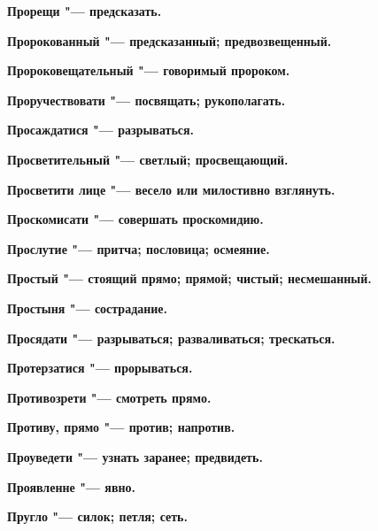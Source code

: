 \begin{mymulticols}{2}
\bfseries Прорещи\normalfont{} "--- предсказать. 




\bfseries Пророкованный\normalfont{} "--- предсказанный; предвозвещенный. 




\bfseries Пророковещательный\normalfont{} "--- говоримый пророком. 




\bfseries Проручествовати\normalfont{} "--- посвящать; рукополагать. 




\bfseries Просаждатися\normalfont{} "--- разрываться. 




\bfseries Просветительный\normalfont{} "--- светлый; просвещающий. 




\bfseries Просветити лице\normalfont{} "--- весело или милостивно взглянуть. 




\bfseries Проскомисати\normalfont{} "--- совершать проскомидию. 




\bfseries Прослутие\normalfont{} "--- притча; пословица; осмеяние. 




\bfseries Простый\normalfont{} "--- стоящий прямо; прямой; чистый; несмешанный. 




\bfseries Простыня\normalfont{} "--- сострадание. 




\bfseries Просядати\normalfont{} "--- разрываться; разваливаться; трескаться. 




\bfseries Протерзатися\normalfont{} "--- прорываться. 




\bfseries Противозрети\normalfont{} "--- смотреть прямо. 




\bfseries Противу, прямо\normalfont{} "--- против; напротив. 




\bfseries Проуведети\normalfont{} "--- узнать заранее; предвидеть. 




\bfseries Проявленне\normalfont{} "--- явно. 




\bfseries Пругло\normalfont{} "--- силок; петля; сеть. 





\end{mymulticols}
